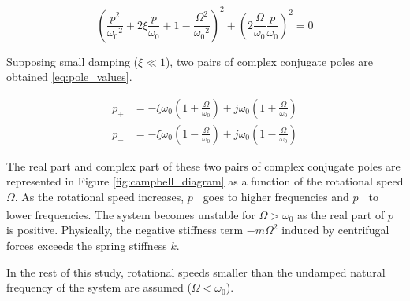 \documentclass[10pt]{iopart}
\begin{document}
\begin{equation}
\label{eq:poles}
  \left( \frac{p^2}{{\omega_0}^2} + 2 \xi \frac{p}{\omega_0} + 1 - \frac{{\Omega}^2}{{\omega_0}^2} \right)^2 + \left( 2 \frac{\Omega}{\omega_0} \frac{p}{\omega_0} \right)^2 = 0
\end{equation}

Supposing small damping (\(\xi \ll 1\)), two pairs of complex conjugate poles are obtained \eqref{eq:pole_values}.

\begin{subequations}
\label{eq:pole_values}
  \begin{align}
    p_{+} &= - \xi \omega_0 \left( 1 + \frac{\Omega}{\omega_0} \right) \pm j \omega_0 \left( 1 + \frac{\Omega}{\omega_0} \right) \\
    p_{-} &= - \xi \omega_0 \left( 1 - \frac{\Omega}{\omega_0} \right) \pm j \omega_0 \left( 1 - \frac{\Omega}{\omega_0} \right)
  \end{align}
\end{subequations}

The real part and complex part of these two pairs of complex conjugate poles are represented in Figure \ref{fig:campbell_diagram} as a function of the rotational speed \(\Omega\).
As the rotational speed increases, \(p_{+}\) goes to higher frequencies and \(p_{-}\) to lower frequencies.
The system becomes unstable for \(\Omega > \omega_0\) as the real part of \(p_{-}\) is positive.
Physically, the negative stiffness term \(-m\Omega^2\) induced by centrifugal forces exceeds the spring stiffness \(k\).

In the rest of this study, rotational speeds smaller than the undamped natural frequency of the system are assumed (\(\Omega < \omega_0\)).
\end{document}
